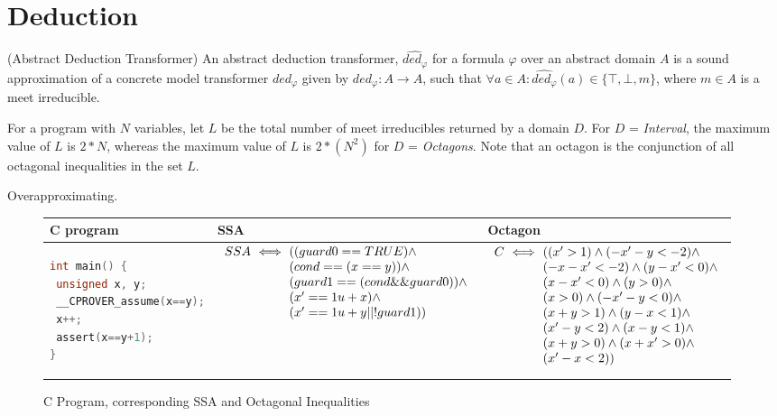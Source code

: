 \section{Deduction}
\begin{definition}{(Abstract Deduction Transformer)} An abstract deduction
transformer, $\widehat{ded_{\varphi}}$ for a formula $\varphi$ over an abstract 
domain $A$ is a sound approximation of a concrete model transformer
$ded_{\varphi}$ given by $\widehat{ded_{\varphi}} : A \rightarrow A$, such that 
$\forall a \in A: \widehat{ded_{\varphi}}(a) \in \{\top, \bot, m\}$, where 
$m \in A$ is a meet irreducible.   
\end{definition}

For a program with $N$ variables, let $L$ be the total number of 
meet irreducibles returned by a domain $D$.  For $D$ = {\em Interval}, the 
maximum value of $L$ is $2*N$, whereas the maximum value of $L$ is 
$2*(N^2)$ for $D$ = {\em Octagons}. Note that an octagon is the conjunction 
of all octagonal inequalities in the set $L$.

Overapproximating.


\begin{figure}[t]
\scriptsize
\begin{tabular}{l|l|l}
\hline
C program & SSA & Octagon \\
\hline
\begin{lstlisting}[mathescape=true,language=C]
int main() {
 unsigned x, y;
 __CPROVER_assume(x==y);
 x++;
 assert(x==y+1);
}
\end{lstlisting}
&
\begin{minipage}{4.40cm}
$\begin{array}{l@{\,\,}c@{\,\,}l}
SSA &\iff& ((guard0 == TRUE) \land \\
    &    & (cond == (x == y)) \land \\
    &    & (guard1 == (cond \&\& guard0)) \land \\
    &    & (x' == 1u + x) \land \\
    &    & (x' == 1u + y || !guard1))
\end{array}$
\end{minipage}
&
\begin{minipage}{3.75cm}
$\begin{array}{l@{\,\,}c@{\,\,}l}
C &\iff& ((x' > 1) \land (-x'-y < -2) \land \\
  &    & (-x-x' < -2) \land (y-x' < 0) \land \\                                                                
  &    & (x-x' < 0) \land (y > 0) \land \\
  &    & (x > 0) \land (-x'-y < 0) \land \\
  &    & (x+y > 1) \land (y-x < 1) \land \\
  &    & (x'-y < 2) \land (x-y < 1) \land \\
  &    & (x+y > 0) \land (x+x' > 0) \land \\
  &    & (x'-x < 2))
\end{array}$
\end{minipage}
\\
\hline
\end{tabular}
\caption{C Program, corresponding SSA and Octagonal Inequalities}
\label{swssa}
\end{figure}
%
